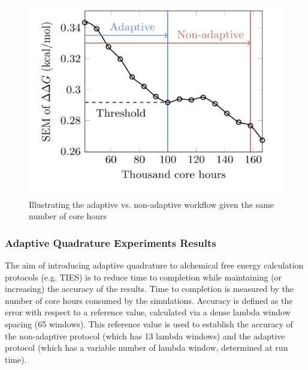 
\begin{figure}
  \centering
    \includegraphics[width=\columnwidth]{figures/adaptive_vs_nonadaptive_pseudo.pdf}
    \caption{Illustrating the adaptive vs. non-adaptive workflow given the
    same number of core hours}
\label{fig:adaptive_vs_nonadaptive_TIES}
\end{figure}

\subsubsection{Adaptive Quadrature Experiments Results}

 

The aim of introducing adaptive quadrature to alchemical free energy 
calculation protocols (e.g. TIES) is to reduce time to completion while 
maintaining (or increasing) the accuracy of the results. Time to completion is 
measured by the number of core hours consumed by the simulations. Accuracy is 
defined as the error with respect to a reference value, calculated via a dense 
lambda window spacing (65 windows). This reference value is used to establish 
the accuracy of the non-adaptive protocol (which has 13 lambda windows) and the 
adaptive protocol (which has a variable number of lambda window, determined at 
run time).

